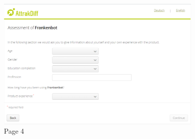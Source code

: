 \begin{appendix}
\begin{figure}[!h]
    \centering
    \includegraphics[width=0.9\textwidth]{img/AttrakDiff_Survey_4.PNG}
    \caption{Page 4 \cite{attrakdiff}}
    \label{fig:attr4}
\end{figure}




\end{appendix}

\endinput